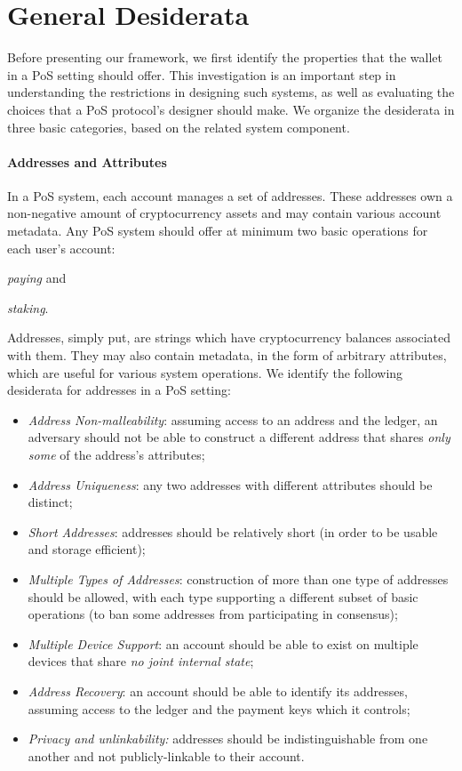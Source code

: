 \section{General Desiderata}\label{sec:desiderata-delegation}

Before presenting our framework, we first identify the properties that the
wallet in a PoS setting should offer. This investigation is an important step
in understanding the restrictions in designing such systems, as well as
evaluating the choices that a PoS protocol's designer should make. We organize
the desiderata in three basic categories, based on the related system
component.

\paragraph{Addresses and Attributes}\label{subsec:address-desiderata}
In a PoS system, each account manages a set of addresses. These addresses own a
non-negative amount of cryptocurrency assets and may contain various account
metadata. Any PoS system should offer at minimum two basic operations for each
user's account:
\begin{inparaenum}[i)]
    \item \emph{paying} and
    \item \emph{staking}.
\end{inparaenum}
Addresses, simply put, are strings which have cryptocurrency balances
associated with them. They may also contain metadata, in the form of arbitrary
attributes, which are useful for various system operations. We identify the
following desiderata for addresses in a PoS setting:
\begin{itemize}
    \item \emph{Address Non-malleability}: assuming access to an address and
        the ledger, an adversary should not be able to construct a different
        address that shares \emph{only some} of the address's attributes;
    \item \emph{Address Uniqueness}: any two addresses with different
        attributes should be distinct;
    \item \emph{Short Addresses}: addresses should be relatively short (in
        order to be usable and storage efficient);
    \item \emph{Multiple Types of Addresses}: construction of more than one
        type of addresses should be allowed, with each type supporting a
        different subset of basic operations (\eg to ban some addresses from
        participating in consensus);
    \item \emph{Multiple Device Support}: an account should be able to exist on
        multiple devices that share \emph{no joint internal state};
    \item \emph{Address Recovery}: an account should be able to identify its
        addresses, assuming access to the ledger and the payment keys which it
        controls;
    \item \emph{Privacy and unlinkability:} addresses should be
        indistinguishable from one another and not publicly-linkable to their
        account.
\end{itemize}

